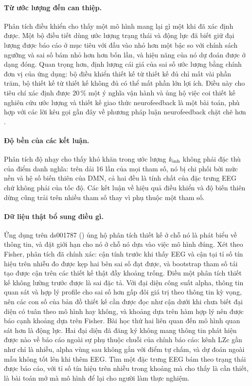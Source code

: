 \paragraph{Từ ước lượng đến can thiệp.} Phân tích điều khiển cho thấy một mô hình mang lại gì một khi đã xác định được. Một bộ điều tiết dùng ước lượng trạng thái và động lực đã biết giữ đại lượng được báo cáo ở mục tiêu với đầu vào nhỏ hơn một bậc so với chính sách ngưỡng và sai số bám nhỏ hơn hơn bốn lần, và hiệu năng của nó dự đoán được ở dạng đóng. Quan trọng hơn,  định lượng cái giá của sai số ước lượng bằng chính đơn vị của ứng dụng: bộ điều khiển thiết kế từ thiết kế đủ chỉ mất vài phần trăm, bộ thiết kế từ thiết kế không đủ có thể mất phần lớn lợi ích. Điều này cho tiêu chí xác định được 20\,\% một ý nghĩa vận hành và ủng hộ việc coi thiết kế nghiên cứu ước lượng và thiết kế giao thức neurofeedback là một bài toán, phù hợp với các lời kêu gọi gần đây về phương pháp luận neurofeedback chặt chẽ hơn \citep{Ros2020,Sitaram2017}.

\paragraph{Độ bền của các kết luận.} Phân tích độ nhạy cho thấy khó khăn trong ước lượng $k_{\mathrm{inh}}$ không phải đặc thù của điểm danh nghĩa: trên dải 16 lần của mọi tham số, nó bị chi phối bởi mức nền và hệ số biến thiên của DMN, cả hai đều là tính chất của đặc trưng EEG chứ không phải của tốc độ. Các kết luận về hiệu quả điều khiển và độ biến thiên dừng cũng trải trên nhiều tham số thay vì phụ thuộc một tham số.

\paragraph{Dữ liệu thật bổ sung điều gì.} Ứng dụng trên ds001787 () ủng hộ phân tích thiết kế ở chỗ nó là phát biểu về thông tin, và đặt giới hạn cho nó ở chỗ nó dựa vào việc mô hình đúng. Xét theo Fisher, phân tích đã chính xác: cận tính trước khi thấy EEG và cận tại tỉ số tín hiệu trên nhiễu đo được kẹp hai bên sai số đạt được, và bootstrap tham số tái tạo được cận trên các thiết kế thật đầy khoảng trống. Điều một phân tích thiết kế không lường trước được là sai đặc tả. Với đại diện công suất alpha, thông tin quan sát và hợp lý profile cho sai số hơn gấp đôi giá trị theo thông tin kỳ vọng, nên các con số của bản đồ thiết kế cần được đọc như cận dưới khi chưa biết đại diện có tuân theo mô hình hay không, và khoảng dựa trên hàm hợp lý nên được báo cạnh khoảng dựa trên Fisher. Bài học thứ hai liên quan đến mô hình quan sát hơn là động lực. Hai đại diện đã đăng ký không mang thông tin phát hiện được nào về báo cáo ngoài sự phụ thuộc chuỗi của chính báo cáo: kênh LZc gần như chỉ là nhiễu, alpha vùng sau không gắn với điểm tự chấm, và dự đoán ngoài mẫu không tốt lên khi thêm EEG. Tìm một đặc trưng EEG bám theo trạng thái được báo cáo, với tỉ số tín hiệu trên nhiễu trong khoảng mà  cho thấy là cần thiết, là bài toán mở mà mô hình để lại cho người làm thực nghiệm.

